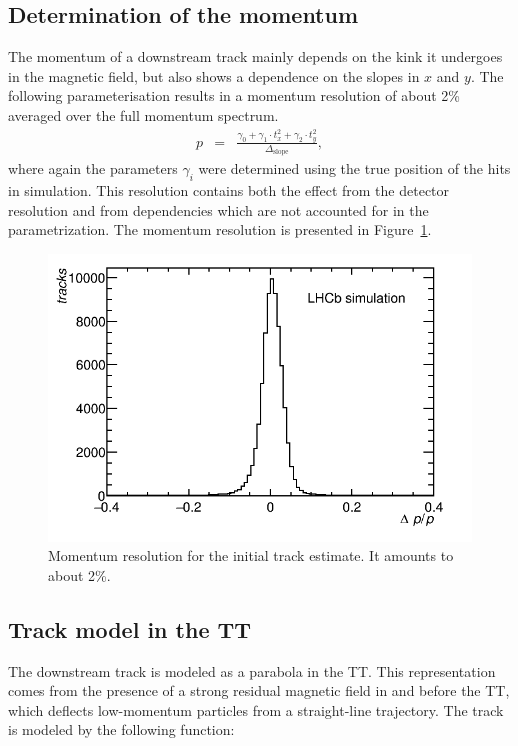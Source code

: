 \subsection{Determination of the momentum}
The momentum of a downstream track mainly depends on the kink it undergoes in the magnetic field, but also shows a dependence on the slopes in $x$ and $y$. The following parameterisation results in a momentum resolution of about 2\% averaged over the full momentum spectrum.
\begin{eqnarray}
\label{eq:momentum}
p & = & \frac{ \gamma_{0} + \gamma_{1} \cdot t_{x}^{2} + \gamma_{2} \cdot t_{y}^{2} }{ \Delta_{\text{slope}} },
\end{eqnarray}
where again the parameters $\gamma_{i}$ were determined using the true position
of the hits in simulation. This resolution contains both the effect from the detector 
resolution and from dependencies which are not accounted for in the parametrization. 
The momentum resolution is presented in Figure~\ref{fig:momReso}.
\begin{figure}[!htbp]
 \begin{center}
   \includegraphics[width=0.8\linewidth]{figures/momReso.png}
    \caption{Momentum resolution for the initial track estimate. It amounts to about 2\%.
     \label{fig:momReso}}
 \end{center}
\end{figure}


\subsection{Track model in the TT}
\label{sec:trackModelTT}
The downstream track is modeled as a parabola in the TT. This representation comes from the presence of a strong residual magnetic field in and before the TT, which deflects low-momentum particles from a straight-line trajectory. 
The track is modeled by the following function:

